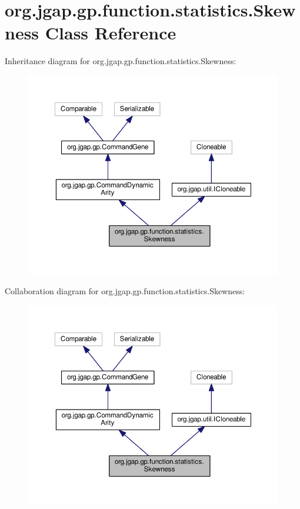 \hypertarget{classorg_1_1jgap_1_1gp_1_1function_1_1statistics_1_1_skewness}{\section{org.\-jgap.\-gp.\-function.\-statistics.\-Skewness Class Reference}
\label{classorg_1_1jgap_1_1gp_1_1function_1_1statistics_1_1_skewness}
}


Inheritance diagram for org.\-jgap.\-gp.\-function.\-statistics.\-Skewness\-:
\nopagebreak
\begin{figure}[H]
\begin{center}
\leavevmode
\includegraphics[width=350pt]{classorg_1_1jgap_1_1gp_1_1function_1_1statistics_1_1_skewness__inherit__graph}
\end{center}
\end{figure}


Collaboration diagram for org.\-jgap.\-gp.\-function.\-statistics.\-Skewness\-:
\nopagebreak
\begin{figure}[H]
\begin{center}
\leavevmode
\includegraphics[width=350pt]{classorg_1_1jgap_1_1gp_1_1function_1_1statistics_1_1_skewness__coll__graph}
\end{center}
\end{figure}
